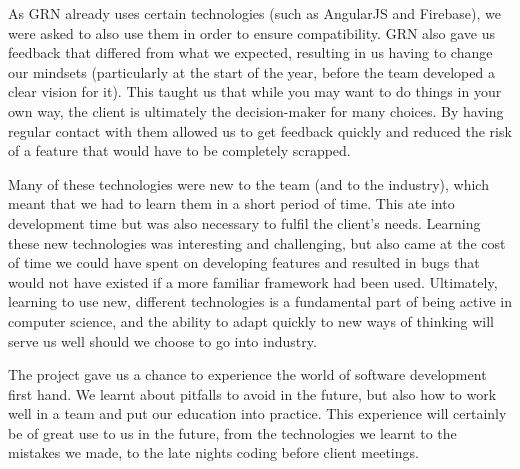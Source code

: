 \documentclass{l3proj}
\begin{document}
As GRN already uses certain technologies (such as AngularJS and Firebase),
 we were asked to also use them in order to ensure compatibility. GRN also
 gave us feedback that differed from what we expected, resulting in us
 having to change our mindsets (particularly at the start of the year,
 before the team developed a clear vision for it). This taught us that
 while you may want to do things in your own way, the client is ultimately
 the decision-maker for many choices. By having regular contact with them
 allowed us to get feedback quickly and reduced the risk of a feature that
 would have to be completely scrapped.

Many of these technologies were new to the team (and to the industry),
 which meant that we had to learn them in a short period of time. This
 ate into development time but was also necessary to fulfil the client's
 needs. Learning these new technologies was interesting and challenging,
 but also came at the cost of time we could have spent on developing
 features and resulted in bugs that would not have existed if a more
 familiar framework had been used. Ultimately, learning to use new, different
 technologies is a fundamental part of being active in computer science,
 and the ability to adapt quickly to new ways of thinking will serve us well
 should we choose to go into industry.

The project gave us a chance to experience the world of software development
 first hand. We learnt about pitfalls to avoid in the future, but also how
 to work well in a team and put our education into practice. This experience
 will certainly be of great use to us in the future, from the technologies we
 learnt to the mistakes we made, to the late nights coding before client meetings.

\newpage

\end{document}
